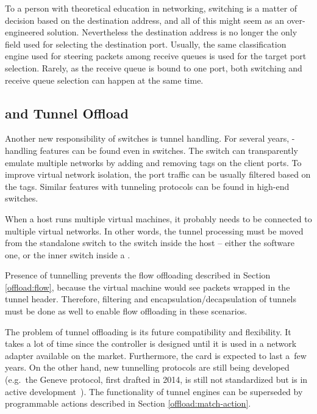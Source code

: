 To a person with theoretical education in networking, switching is a matter of
decision based on the destination  address, and all of this might seem
as an over-engineered solution. Nevertheless the destination  address is no
longer the only field used for selecting the destination port. Usually, the same
classification engine used for steering packets among receive queues is used
for the target port selection. Rarely, as the receive queue is bound to one
port, both switching and receive queue selection can happen at the same time.

\subsection{ and Tunnel Offload}

Another new responsibility of switches is tunnel handling. For several years, -handling
features can be found even in  switches. The switch can
transparently emulate multiple networks by adding and removing  tags on
the client ports. To improve virtual network isolation, the port traffic
can be usually filtered based on the  tags. Similar features with
tunneling protocols can be found in high-end switches.

When a host runs multiple virtual machines, it probably needs to be connected
to multiple virtual networks. In other words, the tunnel processing must be
moved from the standalone switch to the switch inside the host -- either the
software one, or the inner switch inside a .

Presence of tunnelling prevents the flow offloading described in Section \ref{offload:flow},
because the virtual machine would see packets wrapped in the tunnel header.
Therefore, filtering and encapsulation/decapsulation of
tunnels must be done as well to enable flow offloading in these scenarios.

The problem of tunnel offloading is its future compatibility and flexibility.
It takes a lot of time since the controller is designed until it is used in
a network adapter available on the market. Furthermore, the card is expected to
last a~few years. On the other hand, new tunnelling protocols are still being
developed (e.g.\ the Geneve protocol, first drafted in 2014, is still not
standardized but is in active development~\cite{ietf-nvo3-geneve-06}). The
functionality of tunnel engines can be superseded by programmable actions
described in Section \ref{offload:match-action}.

